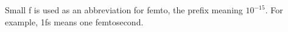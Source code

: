 Small f is used as an abbreviation for femto, the prefix meaning $10^{-15}.$  For example, 1fs means one femtosecond.